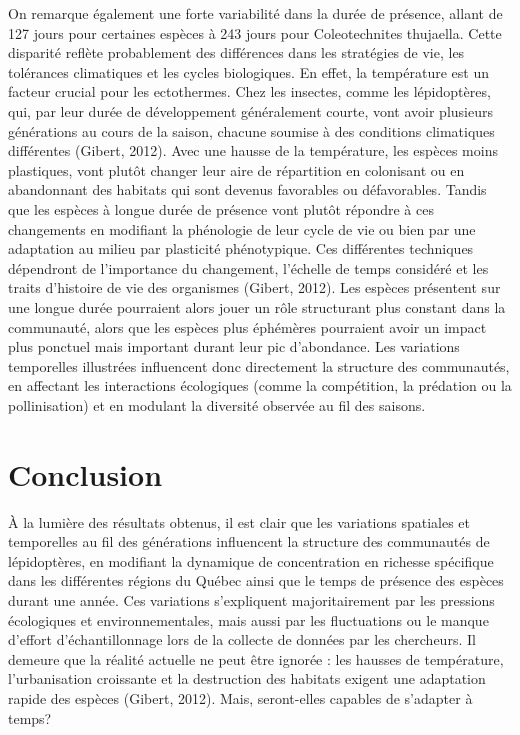 \documentclass[9pt,twocolumn,twoside,]{pnas-new}
\begin{document}
On remarque également une forte variabilité dans la durée de présence,
allant de 127 jours pour certaines espèces à 243 jours pour
Coleotechnites thujaella. Cette disparité reflète probablement des
différences dans les stratégies de vie, les tolérances climatiques et
les cycles biologiques. En effet, la température est un facteur crucial
pour les ectothermes. Chez les insectes, comme les lépidoptères, qui,
par leur durée de développement généralement courte, vont avoir
plusieurs générations au cours de la saison, chacune soumise à des
conditions climatiques différentes (Gibert, 2012). Avec une hausse de la
température, les espèces moins plastiques, vont plutôt changer leur aire
de répartition en colonisant ou en abandonnant des habitats qui sont
devenus favorables ou défavorables. Tandis que les espèces à longue
durée de présence vont plutôt répondre à ces changements en modifiant la
phénologie de leur cycle de vie ou bien par une adaptation au milieu par
plasticité phénotypique. Ces différentes techniques dépendront de
l'importance du changement, l'échelle de temps considéré et les traits
d'histoire de vie des organismes (Gibert, 2012). Les espèces présentent
sur une longue durée pourraient alors jouer un rôle structurant plus
constant dans la communauté, alors que les espèces plus éphémères
pourraient avoir un impact plus ponctuel mais important durant leur pic
d'abondance. Les variations temporelles illustrées influencent donc
directement la structure des communautés, en affectant les interactions
écologiques (comme la compétition, la prédation ou la pollinisation) et
en modulant la diversité observée au fil des saisons.

\section*{Conclusion}\label{conclusion}

À la lumière des résultats obtenus, il est clair que les variations
spatiales et temporelles au fil des générations influencent la structure
des communautés de lépidoptères, en modifiant la dynamique de
concentration en richesse spécifique dans les différentes régions du
Québec ainsi que le temps de présence des espèces durant une année. Ces
variations s'expliquent majoritairement par les pressions écologiques et
environnementales, mais aussi par les fluctuations ou le manque d'effort
d'échantillonnage lors de la collecte de données par les chercheurs. Il
demeure que la réalité actuelle ne peut être ignorée : les hausses de
température, l'urbanisation croissante et la destruction des habitats
exigent une adaptation rapide des espèces (Gibert, 2012). Mais,
seront-elles capables de s'adapter à temps?
\end{document}
